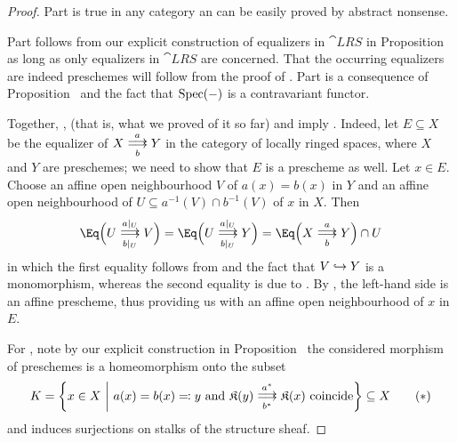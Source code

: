 \documentclass[a4paper,parskip=half,numbers=enddot, DIV=12]{scrreprt}
\begin{document}
\begin{proof}
	Part  is true in any category an can be easily proved by abstract nonsense.
	
	Part  follows from our explicit construction of equalizers in $\cat{LRS}$ in Proposition~ as long as only equalizers in $\cat{LRS}$ are concerned. That the occurring equalizers are indeed preschemes will follow from the proof of . Part  is a consequence of Proposition~ and the fact that $\operatorname{Spec}(-)$ is a contravariant functor. 
	
	Together, ,  (that is, what we proved of it so far) and  imply . Indeed, let $E\subseteq X$ be the equalizer of $X\doublemorphism[a][b]Y$ in the category of locally ringed spaces, where $X$ and $Y$ are preschemes; we need to show that $E$ is a prescheme as well. Let $x\in E$. Choose an affine open neighbourhood $V$ of $a(x)=b(x)$ in $Y$ and an affine open neighbourhood of $U\subseteq a^{-1}(V)\cap b^{-1}(V)$ of $x$ in $X$. Then 
	\begin{align*}
		\Eq\Big(U\doublemorphism[a|_U][b|_U]V\Big)=\Eq\Big(U\doublemorphism[a|_U][b|_U]Y\Big)=\Eq\Big(X\doublemorphism[a][b]Y\Big)\cap U
	\end{align*}
	in which the first equality follows from  and the fact that $V\monomorphism Y$ is a monomorphism, whereas the second equality is due to . By , the left-hand side is an affine prescheme, thus providing us with an affine open neighbourhood of $x$ in $E$.
	
	For , note by our explicit construction in Proposition~ the considered morphism of preschemes is a homeomorphism onto the subset
	\begin{align}\lbl{eq:equalizer1.5}
		K=\left\{x\in X\st a(x)=b(x)\eqqcolon y\text{ and }\KK(y) \doublemorphism[a^*][b^*] \KK(x)\text{ coincide}\right\}\subseteq X\tag{$*$}
	\end{align}
	and induces surjections on stalks of the structure sheaf.
\end{proof}
\end{document}
